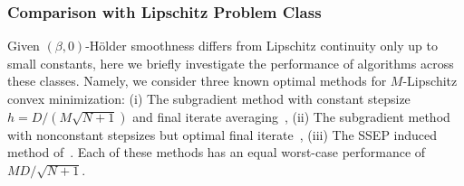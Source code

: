 \documentclass[11pt, hidelinks]{article}
\numberwithin{equation}{section}
\theoremstyle{thmstyletwo}%
\numberwithin{equation}{section}
\newcommand{\Holder}{H\"older }
\begin{document}



\subsubsection{Comparison with Lipschitz Problem Class}
Given $(\beta,0)$-\Holder smoothness differs from Lipschitz continuity only up to small constants, here we briefly investigate the performance of algorithms across these classes. Namely, we consider three known optimal methods for $M$-Lipschitz convex minimization: (i) The subgradient method with constant stepsize $h = D/(M\sqrt{N+1})$ and final iterate averaging~\cite[Section 3.1]{bubeck2015convex}, (ii) The subgradient method with nonconstant stepsizes but optimal final iterate~\cite{zamani2025exact}, (iii) The SSEP induced method of~\cite{constructive_approach}. Each of these methods has an equal worst-case performance of $MD/\sqrt{N+1}$.
\end{document}
